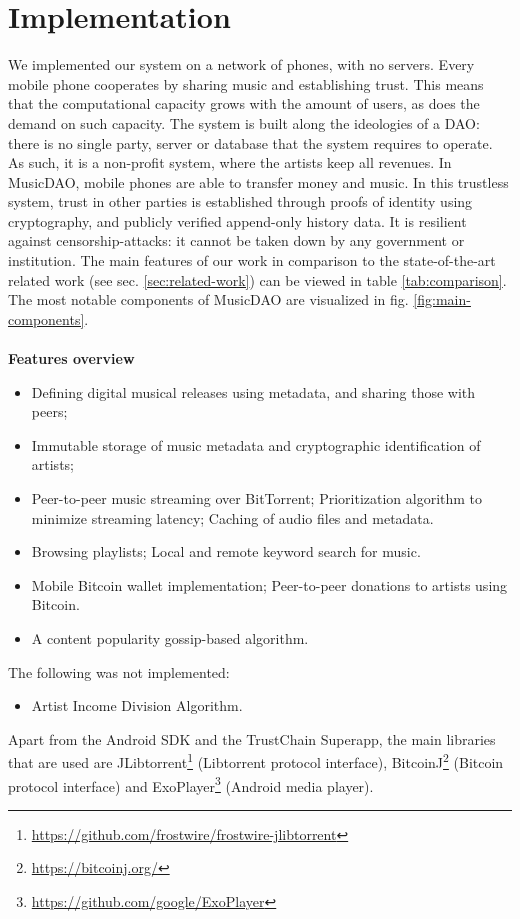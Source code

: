\chapter{Implementation}
We implemented our system on a network of phones, with no servers. Every mobile phone cooperates by sharing music and establishing trust. This means that the computational capacity grows with the amount of users, as does the demand on such capacity. The system is built along the ideologies of a DAO: there is no single party, server or database that the system requires to operate. As such, it is a non-profit system, where the artists keep all revenues. In MusicDAO, mobile phones are able to transfer money and music. In this trustless system, trust in other parties is established through proofs of identity using cryptography, and publicly verified append-only history data. It is resilient against censorship-attacks: it cannot be taken down by any government or institution. The main features of our work in comparison to the state-of-the-art related work (see sec. \ref{sec:related-work}) can be viewed in table \ref{tab:comparison}. The most notable components of MusicDAO are visualized in fig.  \ref{fig:main-components}.
\\
\\
\textbf{Features overview}
\begin{itemize}
    \item Defining digital musical releases using metadata, and sharing those with peers;
    \item Immutable storage of music metadata and cryptographic identification of artists;
    \item Peer-to-peer music streaming over BitTorrent; Prioritization algorithm to minimize streaming latency; Caching of audio files and metadata.
    \item Browsing playlists; Local and remote keyword search for music.
    \item Mobile Bitcoin wallet implementation; Peer-to-peer donations to artists using Bitcoin.
    \item A content popularity gossip-based algorithm.
\end{itemize}
The following was not implemented:
\begin{itemize}
    \item Artist Income Division Algorithm.
\end{itemize}
Apart from the Android SDK and the TrustChain Superapp, the main libraries that are used are JLibtorrent\footnote{\url{https://github.com/frostwire/frostwire-jlibtorrent}} (Libtorrent protocol interface), BitcoinJ\footnote{\url{https://bitcoinj.org/}} (Bitcoin protocol interface) and ExoPlayer\footnote{\url{https://github.com/google/ExoPlayer}} (Android media player). 

